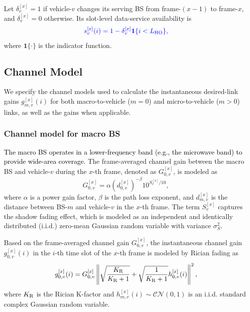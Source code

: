 \documentclass[10pt,journal,letterpaper]{journal_template/IEEEtran}
\newcommand{\rev}[1]{\textcolor{revisioncolor}{{}#1}}
\newif\ifshowdeletions
\newcommand{\currentdel}[1]{\ifshowdeletions\textcolor{deletioncolor}{\sout{#1}}\fi}
\theoremstyle{remark}
\begin{document}
\rev{Let $\delta_v^{[x]}=1$ if vehicle-$v$ changes its serving BS from frame-$(x-1)$ to frame-$x$, and $\delta_v^{[x]}=0$ otherwise. Its slot-level data-service availability is}
\begin{equation}
    \rev{s_v^{[x]}(i)=1-\delta_v^{[x]}\mathbf{1}\{i<L_{\rm HO}\},}
    \label{eq:HO_availability}
\end{equation}
\rev{where $\mathbf{1}\{\cdot\}$ is the indicator function.}

\subsection{Channel Model}

We specify the channel models used to calculate the instantaneous desired-link gains $g_{m,v}^{[x]}(i)$ for both macro-to-vehicle ($m=0$) and micro-to-vehicle ($m>0$) links, as well as the \currentdel{interference-link} gains when applicable.

\subsubsection{Channel model for macro BS}

\textcolor{black}{
The macro BS operates in a lower-frequency band (e.g., the microwave band) to provide wide-area coverage. 
}
The frame-averaged channel gain between the macro BS and vehicle-$v$ during the $x$-th frame, denoted as $G_{0,v}^{[x]}$, is modeled as
\begin{equation}
    G_{0,v}^{[x]} = \alpha \left(d_{0,v}^{[x]}\right)^{-\beta} 10^{S_v^{[x]}/10},
    \label{eq:avg channel gain}
\end{equation}
where $\alpha$ is a power gain factor, $\beta$ is the path loss exponent, and $d_{m,v}^{[x]}$ is the distance between BS-$m$ and vehicle-$v$ in the $x$-th frame. The term $S_v^{[x]}$ captures the shadow fading effect, which is modeled as an independent and identically distributed (i.i.d.) zero-mean Gaussian random variable with variance $\sigma_S^2$. 

Based on the frame-averaged channel gain $G_{0,v}^{[x]}$, the instantaneous channel gain $g_{0,v}^{[x]}(i)$ in the $i$-th time slot of the $x$-th frame is modeled by Rician fading as
\begin{equation}
    g_{0,v}^{[x]}(i) = G_{0,v}^{[x]}\left\|\sqrt{\frac{K_{\rm R}}{K_{\rm R}+1}} + \sqrt{\frac{1}{K_{\rm R}+1}} h_{0,v}^{[x]}(i)\right\|^2,
    \label{eq:instant channel condition}
\end{equation}
where $K_{\rm R}$ is the Rician K-factor and $h_{m,v}^{[x]}(i) \sim \mathcal{CN}\left(0,1\right)$ is an i.i.d. standard complex Gaussian random variable. 
\end{document}
